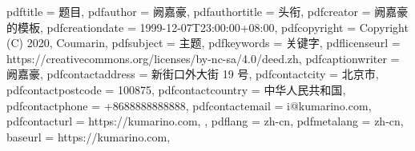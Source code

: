 
\hypersetup
{
	pdftitle			= {题目},
	pdfauthor			= {阙嘉豪},
	pdfauthortitle		= {头衔},
	pdfcreator			= {阙嘉豪的模板},
	pdfcreationdate		= {1999-12-07T23:00:00+08:00},
	pdfcopyright		= {Copyright (C) 2020, Coumarin},
	pdfsubject			= {主题},
	pdfkeywords			= {关键字},
	pdflicenseurl		= {https://creativecommons.org/licenses/by-nc-sa/4.0/deed.zh},
	pdfcaptionwriter	= {阙嘉豪},
	pdfcontactaddress	= {新街口外大街 19 号},
	pdfcontactcity		= {北京市},
	pdfcontactpostcode	= {100875},
	pdfcontactcountry	= {中华人民共和国},
	pdfcontactphone		= {+8688888888888},
	pdfcontactemail		= {i@kumarino.com},
	pdfcontacturl		= {%
		https://kumarino.com,
	},
	pdflang				= {zh-cn},
	pdfmetalang			= {zh-cn},
	baseurl				= {https://kumarino.com},
}
